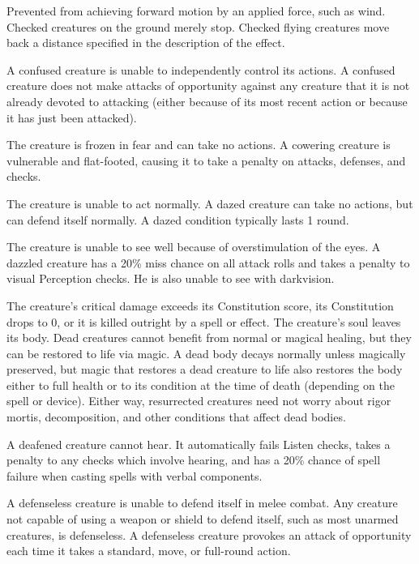  Prevented from achieving forward motion by an applied force, such as wind. Checked creatures on the ground merely stop. Checked flying creatures move back a distance specified in the description of the effect.

\label{Confused} A confused creature is unable to independently control its actions. \confusionexplanation A confused creature does not make attacks of opportunity against any creature that it is not already devoted to attacking (either because of its most recent action or because it has just been attacked).

 The creature is frozen in fear and can take no actions. A cowering creature is vulnerable and flat-footed, causing it to take a  penalty on attacks, defenses, and checks.

 The creature is unable to act normally. A dazed creature can take no actions, but can defend itself normally. A dazed condition typically lasts 1 round.

 The creature is unable to see well because of overstimulation of the eyes. A dazzled creature has a 20\% miss chance on all attack rolls and takes a  penalty to visual Perception checks. He is also unable to see with darkvision.

 The creature's critical damage exceeds its Constitution score, its Constitution drops to 0, or it is killed outright by a spell or effect. The creature's soul leaves its body. Dead creatures cannot benefit from normal or magical healing, but they can be restored to life via magic. A dead body decays normally unless magically preserved, but magic that restores a dead creature to life also restores the body either to full health or to its condition at the time of death (depending on the spell or device). Either way, resurrected creatures need not worry about rigor mortis, decomposition, and other conditions that affect dead bodies.

 A deafened creature cannot hear. It automatically fails Listen checks, takes a  penalty to any checks which involve hearing, and has a 20\% chance of spell failure when casting spells with verbal components.

 A defenseless creature is unable to defend itself in melee combat. Any creature not capable of using a weapon or shield to defend itself, such as most unarmed creatures, is defenseless. A defenseless creature provokes an attack of opportunity each time it takes a standard, move, or full-round action.

